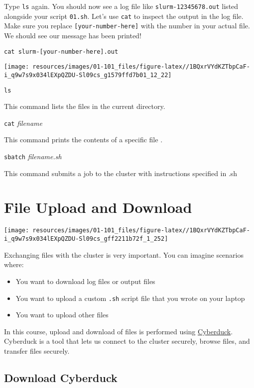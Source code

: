 \documentclass[
]{book}
\providecommand{\tightlist}{%
  \setlength{\itemsep}{0pt}\setlength{\parskip}{0pt}}
\begin{document}
Type \texttt{ls} again. You should now see a log file like \texttt{slurm-12345678.out} listed alongside your script \texttt{01.sh}. Let's use \texttt{cat} to inspect the output in the log file. Make sure you replace \texttt{{[}your-number-here{]}} with the number in your actual file. We should see our message has been printed!

\begin{verbatim}
cat slurm-[your-number-here].out
\end{verbatim}

\texttt{[image: resources/images/01-101\_files/figure-latex//1BQxrVYdKZTbpCaF-i\_q9w7s9x034lEXpQZDU-Sl09cs\_g1579ffd7b01\_12\_22]}

\texttt{ls}

This command lists the files in the current directory.

\texttt{cat} \emph{filename}

This command prints the contents of a specific file .

\texttt{sbatch} \emph{filename.sh}

This command submits a job to the cluster with instructions specified in .sh

\hypertarget{file-upload-and-download}{%
\chapter{File Upload and Download}\label{file-upload-and-download}}

\texttt{[image: resources/images/01-101\_files/figure-latex//1BQxrVYdKZTbpCaF-i\_q9w7s9x034lEXpQZDU-Sl09cs\_gff2211b72f\_1\_252]}

Exchanging files with the cluster is very important. You can imagine scenarios where:

\begin{itemize}
\tightlist
\item
  You want to download log files or output files
\item
  You want to upload a custom \texttt{.sh} script file that you wrote on your laptop
\item
  You want to upload other files
\end{itemize}

In this course, upload and download of files is performed using \href{https://cyberduck.io/}{Cyberduck}. Cyberduck is a tool that lets us connect to the cluster securely, browse files, and transfer files securely.

\hypertarget{download-cyberduck}{%
\section{Download Cyberduck}\label{download-cyberduck}}
\end{document}

